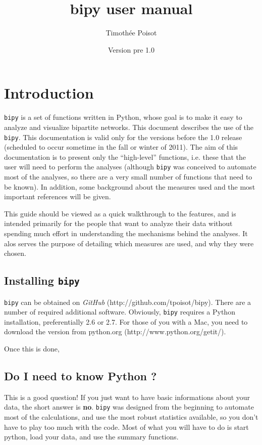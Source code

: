 \documentclass[10pt]{scrbook}
\title{bipy user manual}
\author{Timothée Poisot}
\date{Version pre 1.0}
\begin{document}
\maketitle
\tableofcontents

\chapter{Introduction}

\texttt{bipy} is a set of functions written in Python, whose goal is to make it easy to analyze and visualize bipartite networks. This document describes the use of the \texttt{bipy}. This documentation is valid only for the versions before the 1.0 release (scheduled to occur sometime in the fall or winter of 2011). The aim of this documentation is to present only the ``high-level'' functions, i.e. these that the user will need to perform the analyses (although \texttt{bipy} was conceived to automate most of the analyses, so there are a very small number of functions that need to be known). In addition, some background about the measures used and the most important references will be given.

This guide should be viewed as a quick walkthrough to the features, and is intended primarily for the people that want to analyze their data without spending much effort in understanding the mechanisms behind the analyses. It alos serves the purpose of detailing which measures are used, and why they were chosen.

\section{Installing \texttt{bipy}}

\texttt{bipy} can be obtained on \emph{GitHub} (http://github.com/tpoisot/bipy). There are a number of required additional software. Obviously, \texttt{bipy} requires a Python installation, preferentially 2.6 or 2.7. For those of you with a Mac, you need to download the version from python.org (http://www.python.org/getit/).

Once this is done, 

\section{Do I need to know Python ?}

This is a good question! If you just want to have basic informations about your data, the short answer is \textbf{no}. \texttt{bipy} was designed from the beginning to automate most of the calculations, and use the most robust statistics available, so you don't have to play too much with the code. Most of what you will have to do is start python, load your data, and use the summary functions.
\end{document}

